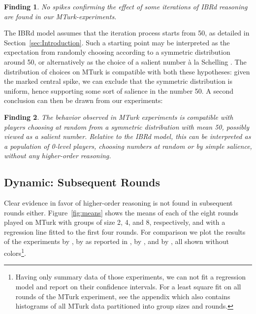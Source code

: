 \documentclass[12pt,review]{elsarticle}
\newtheorem{fdn}{Finding}
\begin{document}
\begin{fdn}
No spikes confirming the effect of some iterations of IBRd reasoning are found in our MTurk-experiments.
\end{fdn}

The IBRd model assumes that the iteration process starts from 50, as detailed in Section~\ref{sec:Introduction}. Such a starting point may be interpreted as the expectation from randomly choosing according to a symmetric distribution around 50, or alternatively as the choice of a salient number \`{a} la Schelling \citep{sch60}. The distribution of choices on MTurk is compatible with both these hypotheses: given the marked central spike, we can exclude that the symmetric distribution is uniform, hence supporting some sort of salience in the number 50. A second conclusion can then be drawn from our experiments: 

\begin{fdn}
The behavior observed in MTurk experiments is compatible with players choosing at random from a symmetric distribution with mean 50, possibly viewed as a salient number. Relative to the IBRd model, this can be interpreted as a population of 0-level players, choosing numbers at random or by simple salience, without any higher-order reasoning.
\end{fdn}

\subsection{Dynamic: Subsequent Rounds\label{subsec:Dynamic:-Subsequent-Rounds}}
\noindent
Clear evidence in favor of higher-order reasoning is not found in subsequent rounds either. Figure~\ref{fig:means} shows the means of each of the eight rounds played on MTurk with groups of size 2, 4, and 8, respectively, and with a regression line fitted to the first four rounds. For comparison we plot the results of the experiments by \citet{Nagel95}, by \citet{Kamm2008unter} as reported in \cite{diekmann2009rational}, by \citet{weber2003learning}, and by \citet{buhren2010chess}, all shown without colors\footnote{Having only summary data of those experiments, we can not fit a regression model and report on their confidence intervals. For a least square fit on all rounds of the MTurk experiment, see the appendix which also contains histograms of all MTurk data partitioned into group sizes and rounds.}. 
\end{document}
